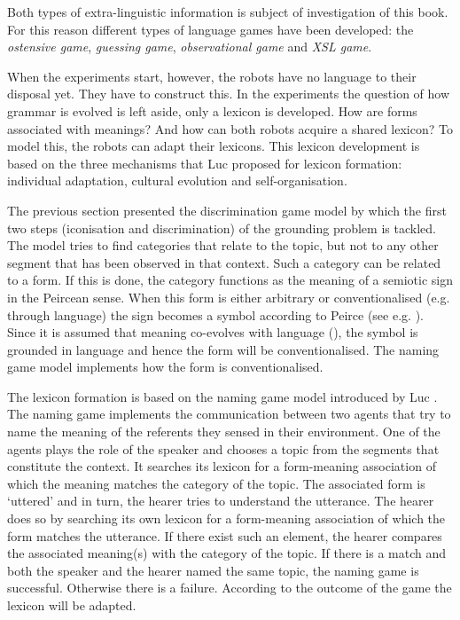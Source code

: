 Both types of extra-linguistic information is subject of investigation of this book. For this reason different types of language games have been developed: the {\em ostensive game}, {\em guessing game}, {\em observational game} and {\em XSL game}.


When the experiments start, however, the robots have no language to their disposal yet. They have to construct this. In the experiments the question of how grammar is evolved is left aside, only a lexicon is developed. How are forms associated with meanings? And how can both robots acquire a shared lexicon? To model this, the robots can adapt their lexicons. This lexicon development is based on the three mechanisms that Luc \citet{steels:1996a} proposed for lexicon formation: individual adaptation, cultural evolution and self-organisation.

The previous section presented the discrimination game model by which the first two steps (iconisation and discrimination) of the grounding problem is tackled. The model tries to find categories that relate to the topic, but not to any other segment that has been observed in that context. Such a category can be related to a form. If this is done, the category functions as the meaning of a semiotic sign in the Peircean sense. When this form is either arbitrary or conventionalised (e.g. through language) the sign becomes a symbol according to Peirce (see e.g. \citealt{chandler:1994}). Since it is assumed that meaning co-evolves with language (), the symbol is grounded in language and hence the form will be conventionalised. The naming game model implements how the form is conventionalised.

The lexicon formation is based on the naming game model introduced by Luc \citet{steels:1996a}. The naming game implements the communication between two agents that try to name the meaning of the referents they sensed in their environment. One of the agents plays the role of the speaker and chooses a topic from the segments that constitute the context. It searches its lexicon for a form-meaning association of which the meaning matches the category of the topic. The associated form is `uttered' and in turn, the hearer tries to understand the utterance. The hearer does so by searching its own lexicon for a form-meaning association of which the form matches the utterance. If there exist such an element, the hearer compares the associated meaning(s) with the category of the topic. If there is a match and both the speaker and the hearer named the same topic, the naming game is successful. Otherwise there is a failure. According to the outcome of the game the lexicon will be adapted. 

